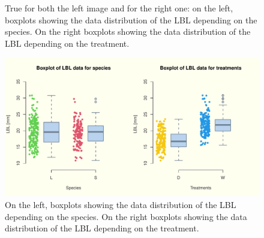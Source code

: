 \documentclass{article}
\begin{document}
\begin{figure}[H]
     \centering
     \caption{True for both the left image and for the right one: on the left, boxplots showing the data distribution of the LBL depending on the species. On the right boxplots showing the data distribution of the LBL depending on the treatment.}
      \qquad
\end{figure}
\iffalse
\begin{figure}[H]
\centering
  \includegraphics[scale=0.5]{boxplots_lbl.pdf}
\caption{On the left, boxplots showing the data distribution of the LBL depending on the species. On the right boxplots showing the data distribution of the LBL depending on the treatment.}
  \label{fig:boxi1}
\end{figure}
\end{document}
